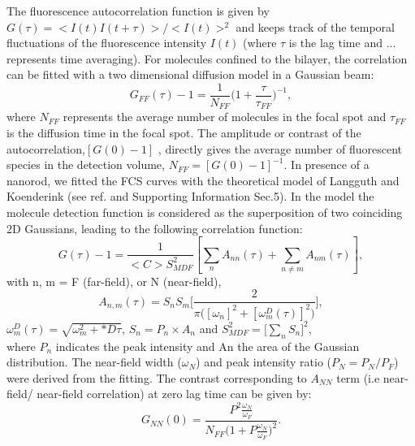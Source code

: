 \documentclass[journal=jpccck,manuscript=article]{achemso}
\begin{document}
The fluorescence autocorrelation function is given by $G(\tau)=<I(t)I(t+\tau)>/<I(t)>^2$ and keeps
track of the temporal fluctuations of the fluorescence intensity $I(t)$ (where $\tau$ is the lag time and
... represents time averaging). For molecules confined to the bilayer, the correlation can be fitted with a two dimensional diffusion model in a Gaussian beam:
\begin{equation}
	G_{FF}(\tau)-1 = \frac{1}{N_{FF}}\bigg(1+\frac{\tau}{\tau_{FF}} \bigg)^{-1},
	\label{eq:2D-gauss-diffusion}
\end{equation}
where $N_{FF}$ represents the average number of molecules in the focal spot and $\tau_{FF}$ is the diffusion time in the focal spot. The amplitude or contrast of the autocorrelation,$[G(0)-1]$ , directly gives the average number of fluorescent species in the detection volume, $N_{FF}=[G(0)-1]^{-1}$. In presence of a nanorod, we fitted the FCS curves with the theoretical model of Langguth and Koenderink (see ref.\cite{langguth2014simple} and Supporting Information Sec.5). In the model the molecule detection function is considered as the superposition of two coinciding 2D Gaussians, leading to the following correlation function:
\begin{equation}
	G(\tau)-1 = \frac{1}{<C>S_{MDF}^2}[\sum_{n}A_{nn}(\tau) + \sum_{n\neq m}A_{nm}(\tau)],
	\label{eqm:far-near-gauss}
\end{equation}
with n, m = F (far-field), or N (near-field),
\begin{equation}
	A_{n,m}(\tau)=S_nS_m\Bigg[\frac{2}{\pi\Big([\omega_n]^2 + [\omega_m^D(\tau)]^2 \Big)}\Bigg] ,
	\label{eqm:area-gauss}
\end{equation}
$\omega_m^D(\tau)=\sqrt{\omega_m^2 + *D\tau}$, $S_n=P_n\times A_n$ and $S_{MDF}^2=\Big[\sum_{n}S_n\Big]^2$,\\
where $P_n$ indicates the peak intensity and An the area of the Gaussian distribution. The near-field width ($\omega_N$) and peak intensity ratio ($P_N=P_N/P_F$) were derived from the fitting. The contrast corresponding to
$A_{NN}$ term (i.e near-field/ near-field correlation) at zero lag time can be given by:
\begin{equation}
	G_{NN}(0) = \frac{P^2\frac{\omega_N}{\omega_F}} {N_{FF}\Big(1+P\frac{\omega_N}{\omega_F}\Big)^2}.
	\label{eqm:contrast_enhnc}
\end{equation}
\end{document}
